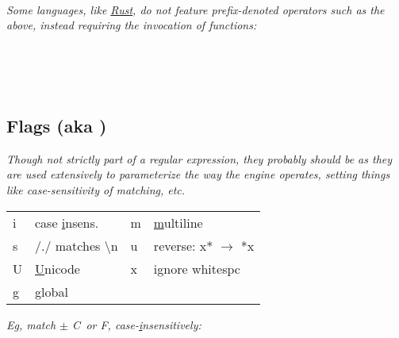 \\

\textit{Some languages, like \href{https://docs.rs/regex/1.4.3/regex/}{Rust}, do not feature prefix-denoted operators such as the above, instead requiring the invocation of functions:}

\\
\\
\\


\subsection*{Flags (aka )}
\textit{Though not strictly part of a regular expression, they probably should be as they are used extensively to parameterize the way the engine operates, setting things like case-sensitivity of matching, etc.}
\begin{tabular}{l  l  l  l}
    i       & case \ul{i}nsens.             &
    m       & \ul{m}ultiline                \\
    s       & /./ matches \textbackslash n  &
    u       & reverse: x* $\to$ *x          \\
    U       & \ul{U}nicode                  &
    x       & ignore whitespc               \\
    g       & \ul{g}lobal
\end{tabular}

\vspace{2mm}
\textit{Eg, match $\pm$ C\textdegree\, or F\textdegree, case-\ul{i}nsensitively:}\\
\\




\begin{comment}
\subsection*{Dump of Examples}

\entry{35mm}{[a-zA-Z\_][a-zA-Z\_0-9]*]}{valid var. names}\\
\code{http://[-a-z0-9\_.:]+/[-a-z0-9\_:@\&?=+,.!/\textasciitilde *\%\$]*}\\
\entry{35mm}{}{naive URL}\\
\entry{35mm}{}{}\\
\end{comment}



